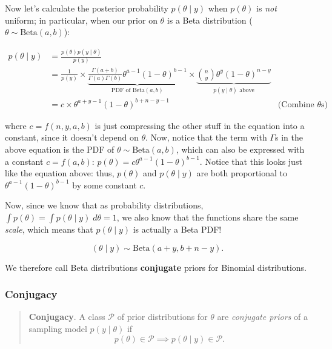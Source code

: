 \documentclass[
]{article}
\begin{document}
Now let's calculate the posterior probability \(p(\theta \mid y)\) when
\(p(\theta)\) is \emph{not} uniform; in particular, when our prior on
\(\theta\) is a Beta distribution (\(\theta \sim \text{Beta}(a, b)\)):

\begin{align}
p(\theta \mid y) &= \frac{p(\theta) p(y \mid \theta)}{p(y)} & \\
&= \frac{1}{p(y)} \times \underbrace{\frac{\Gamma(a + b)}{\Gamma(a)
\Gamma(b)}\theta^{a - 1}(1 - \theta)^{b - 1}}_{\text{PDF of $\text{Beta}(a,
b)$}} \times \underbrace{{n \choose y} \theta^y (1 - \theta)^{n -
y}}_{\text{$p(y \mid \theta)$ above}} & \\
&= c \times \theta^{a + y - 1} (1 - \theta)^{b + n - y - 1} & \text{(Combine $\theta$s)} \
\end{align}

where \(c = f(n, y, a, b)\) is just compressing the other stuff in the
equation into a constant, since it doesn't depend on \(\theta\). Now,
notice that the term with \(\Gamma\)s in the above equation is the PDF
of \(\theta \sim \text{Beta}(a, b)\), which can also be expressed with a
constant \(c = f(a, b)\):
\(p(\theta) = c \theta^{a - 1}(1 - \theta)^{b - 1}\). Notice that this
looks just like the equation above: thus, \(p(\theta)\) and
\(p(\theta \mid y)\) are both proportional to
\(\theta^{a - 1} (1 - \theta)^{b - 1}\) by some constant \(c\).

Now, since we know that as probability distributions,
\(\int p(\theta) = \int p(\theta \mid y) \; d\theta = 1\), we also know
that the functions share the same \emph{scale}, which means that
\(p(\theta \mid y)\) is actually a Beta PDF!

\[
(\theta \mid y) \sim \text{Beta}(a + y, b + n - y).
\]

We therefore call Beta distributions \textbf{conjugate} priors for
Binomial distributions.

\hypertarget{conjugacy}{%
\subsubsection{Conjugacy}\label{conjugacy}}

\begin{quote}
\textbf{Conjugacy}. A class \(\mathcal{P}\) of prior distributions for
\(\theta\) are \emph{conjugate priors} of a sampling model
\(p(y \mid \theta)\) if \[ p(\theta) \in
\mathcal{P} \implies p(\theta \mid y) \in \mathcal{P}.\]
\end{quote}
\end{document}
